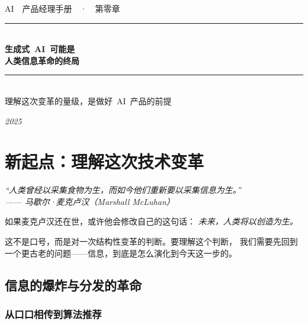 \documentclass[12pt, a4paper, openany]{book}
\newcommand{\emphasis}[1]{\textit{\color{AccentGold}#1}}
\begin{document}
\frontmatter

\thispagestyle{empty}
\vspace*{4cm}
\begin{center}
  {\color{WarmGray}\footnotesize AI\ \ 产品经理手册\ \ ·\ \ 第零章}\\[6pt]
  \color{AccentBlue}\rule{8cm}{1pt}\\[18pt]
  {\fontsize{28}{34}\selectfont\bfseries 生成式\ AI\ 可能是\\[6pt]人类信息革命的终局}\\[20pt]
  \color{AccentBlue}\rule{8cm}{0.5pt}\\[20pt]
  {\large\color{WarmGray} 理解这次变革的量级，是做好\ AI\ 产品的前提}
\end{center}
\vfill
\begin{center}
  \color{TimelineGray}\small\itshape 2025
\end{center}
\newpage

\mainmatter
\setcounter{chapter}{0}

\chapter{新起点：理解这次技术变革}

\vspace{-4pt}
\begin{blockquote}
\itshape\color{WarmGray}
``人类曾经以采集食物为生，而如今他们重新要以采集信息为生。''\\
\hfill —— 马歇尔·麦克卢汉（Marshall McLuhan）
\end{blockquote}
\vspace{10pt}

如果麦克卢汉还在世，或许他会修改自己的这句话：
\emphasis{未来，人类将以创造为生。}

这不是口号，而是对一次结构性变革的判断。要理解这个判断，
我们需要先回到一个更古老的问题——信息，到底是怎么演化到今天这一步的。

\section{信息的爆炸与分发的革命}

\subsection{从口口相传到算法推荐}
\end{document}
